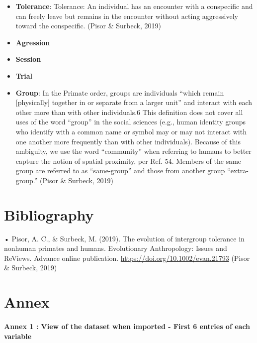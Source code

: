 \documentclass[
]{article}
\providecommand{\tightlist}{%
  \setlength{\itemsep}{0pt}\setlength{\parskip}{0pt}}
\begin{document}
\begin{itemize}
\tightlist
\item
  \textbf{Tolerance}: Tolerance: An individual has an encounter with a
  conspecific and can freely leave but remains in the encounter without
  acting aggressively toward the conspecific. (Pisor \& Surbeck, 2019)
\item
  \textbf{Agression}
\item
  \textbf{Session}
\item
  \textbf{Trial}
\item
  \textbf{Group}: In the Primate order, groups are individuals ``which
  remain {[}physically{]} together in or separate from a larger unit''
  and interact with each other more than with other individuals.6 This
  definition does not cover all uses of the word ``group'' in the social
  sciences (e.g., human identity groups who identify with a common name
  or symbol may or may not interact with one another more frequently
  than with other individuals). Because of this ambiguity, we use the
  word ``community'' when referring to humans to better capture the
  notion of spatial proximity, per Ref. 54. Members of the same group
  are referred to as ``same-group'' and those from another group
  ``extra-group.'' (Pisor \& Surbeck, 2019)
\end{itemize}

\hypertarget{bibliography-1}{%
\section{Bibliography}\label{bibliography-1}}

• Pisor, A. C., \& Surbeck, M. (2019). The evolution of intergroup
tolerance in nonhuman primates and humans. Evolutionary Anthropology:
Issues and ReViews. Advance online publication.
\url{https://doi.org/10.1002/evan.21793} (Pisor \& Surbeck, 2019)

\hypertarget{annex}{%
\section{Annex}\label{annex}}

\hypertarget{annex-1-view-of-the-dataset-when-imported---first-6-entries-of-each-variable}{%
\paragraph{Annex 1 : View of the dataset when imported - First 6 entries
of each
variable}\label{annex-1-view-of-the-dataset-when-imported---first-6-entries-of-each-variable}}
\end{document}
